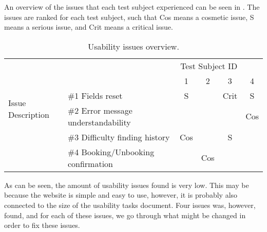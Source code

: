 An overview of the issues that each test subject experienced can be seen in .
The issues are ranked for each test subject, such that Cos means a cosmetic issue, S means a serious issue, and Crit means a critical issue.
\begin{table}[h]
	\centering
	\begin{tabular}{ll|cccc}
		\multicolumn{1}{c}{}&\multicolumn{4}{r}{Test Subject ID}&\\
		\multicolumn{2}{c|}{}&1&2&3&4\\
		\cline{2-6}
		\multirow{2}{*}{Issue Description}& {\#}1 Fields reset & S &  & Crit & S\\
		& {\#}2 Error message understandability &  &  &  & Cos\\
		& {\#}3 Difficulty finding history & Cos &  & S & \\
		& {\#}4 Booking/Unbooking confirmation &  & Cos &  & \\
	\end{tabular}
	\caption{Usability issues overview.}\label{tab:usabilityissues}
\end{table}

As can be seen, the amount of usability issues found is very low.
This may be because the website is simple and easy to use, however, it is probably also connected to the size of the usability tasks document.
Four issues was, however, found, and for each of these issues, we go through what might be changed in order to fix these issues.

